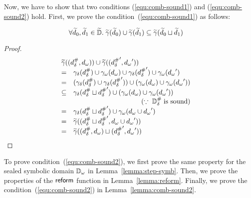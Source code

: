 Now, we have to show that two conditions (\ref{equ:comb-sound1})
and (\ref{equ:comb-sound2}) hold.
First, we prove the condition~(\ref{equ:comb-sound1}) as follows:
\begin{lemma}
  \[
    \forall \widetilde{d}_0, \widetilde{d}_1 \in \widetilde{\mathbb{D}}. \; \widetilde{\gamma}(\widetilde{d}_0) \cup
    \widetilde{\gamma}(\widetilde{d}_1) \subseteq \widetilde{\gamma}(\widetilde{d}_0 \sqcup \widetilde{d}_1)
  \]
\end{lemma}
\begin{proof}
  \[
    \begin{array}{cl}
      \multicolumn{2}{l}{
        \combgamma((\sabselem, \symbelem)) \cup \combgamma((\sabselem', \symbelem'))
      }\\
      =& \sgamma(\sabselem) \cup \symbgamma(\symbelem)
      \cup \sgamma(\sabselem') \cup \symbgamma(\symbelem')\\
      =& (\sgamma(\sabselem)\cup \sgamma(\sabselem'))
      \cup (\symbgamma(\symbelem) \cup \symbgamma(\symbelem'))\\
      \subseteq& \sgamma(\sabselem \join \sabselem')
      \cup (\symbgamma(\symbelem) \cup \symbgamma(\symbelem'))\\
      & \multicolumn{1}{r}{(\because \; \sabsdom \; \text{is sound})}\\
      =& \sgamma(\sabselem \join \sabselem')
      \cup \symbgamma(\symbelem \cup \symbelem')\\
      =& \combgamma((\sabselem \join \sabselem', \symbelem \cup \symbelem'))\\
      =& \combgamma((\sabselem, \symbelem) \join (\sabselem', \symbelem'))\\
    \end{array}
  \]
\end{proof}

To prove condition~(\ref{equ:comb-sound2}), we first prove the same property for
the sealed symbolic domain ${\mathbb{D}}_\omega$ in Lemma~\ref{lemma:step-symb}.  Then, we
prove the properties of the $\textsf{reform}$ function in Lemma~\ref{lemma:reform}.
Finally, we prove the condition~(\ref{equ:comb-sound2}) in
Lemma~\ref{lemma:comb-sound2}.

